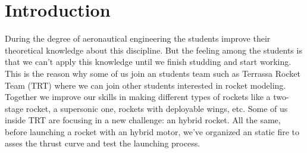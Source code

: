 
\section*{Introduction}

During the degree of aeronautical engineering the students improve their theoretical knowledge about this discipline. But the feeling among the students is that we can’t apply this knowledge until we finish studding and start working. This is the reason why some of us join an students team such as Terrassa Rocket Team (TRT) where we can join other students interested in rocket modeling. Together we improve our skills in making different types of rockets like a two-stage rocket, a supersonic one, rockets with deployable wings, etc. Some of us inside TRT are focusing in a new challenge: an hybrid rocket.
All the same, before launching a rocket with an hybrid motor, we've organized an static fire to asses the thrust curve and test the launching process.
